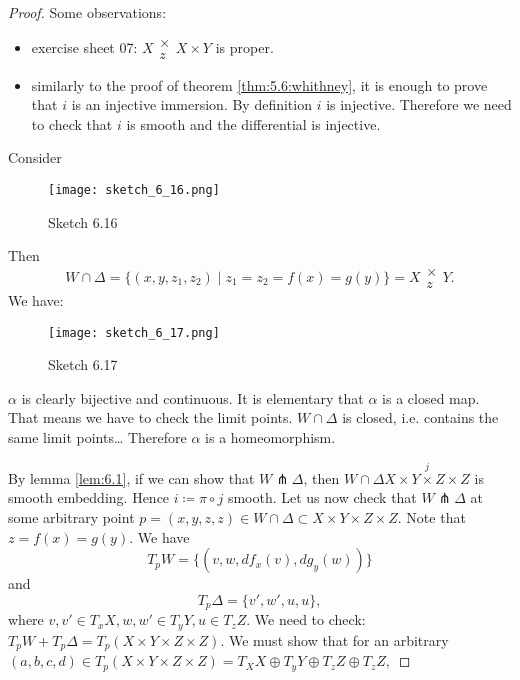 \begin{proof}
    Some observations:
    \begin{itemize}
        \item exercise sheet 07: \(X\substack{\times\\z}X\times Y\) is proper.
        \item similarly to the proof of theorem \ref{thm:5.6:whithney}, it is enough to prove that 
              \(i\) is an injective immersion. By definition \(i\) is injective. Therefore we need to check that \(i\) is smooth and the differential is injective.
    \end{itemize}

    Consider 
    \begin{figure}[H]
        \centering
        \texttt{[image: sketch\_6\_16.png]}
        \caption{Sketch 6.16}
    \end{figure}
    Then \[W\cap \Delta=\{(x,y,z_1,z_2)\mid z_1=z_2=f(x)=g(y)\}=X\substack{\times\\z}Y.\]
    We have: 
    \begin{figure}[H]
        \centering
        \texttt{[image: sketch\_6\_17.png]}
        \caption{Sketch 6.17}
    \end{figure} 
    \(\alpha\) is clearly bijective and continuous. It is elementary that \(\alpha\) is a closed map.
    That means we have to check the limit points. \(W\cap \Delta\) is closed, i.e. contains the same limit points\dots   
    Therefore \(\alpha\) is a homeomorphism.

    By lemma \ref{lem:6.1}, if we can show that \(W\pitchfork \Delta\), then \(W\cap \Delta\stackrel{j}{X\times Y\times Z\times Z}\) is smooth embedding. 
    Hence \(i\coloneqq \pi\circ j\) smooth. Let us now check that \(W\pitchfork \Delta\) at some arbitrary point \(p=(x,y,z,z)\in W\cap \Delta\subset X\times Y\times Z\times Z\).
    Note that \(z=f(x)=g(y)\). We have \[T_pW=\{(v,w,df_x(v),dg_y(w))\}\]
    and 
    \[T_p\Delta=\{v',w',u,u\},\]
    where \(v,v'\in T_xX,w,w'\in T_yY,u\in T_zZ.\)
    We need to check: \(T_p W+T_p\Delta=T_p(X\times Y\times Z\times Z)\). We must show that for an arbitrary \((a,b,c,d)\in T_p(X\times Y\times Z\times Z)=T_XX\oplus T_yY\oplus T_zZ \oplus T_zZ,\)
    
\end{proof}


